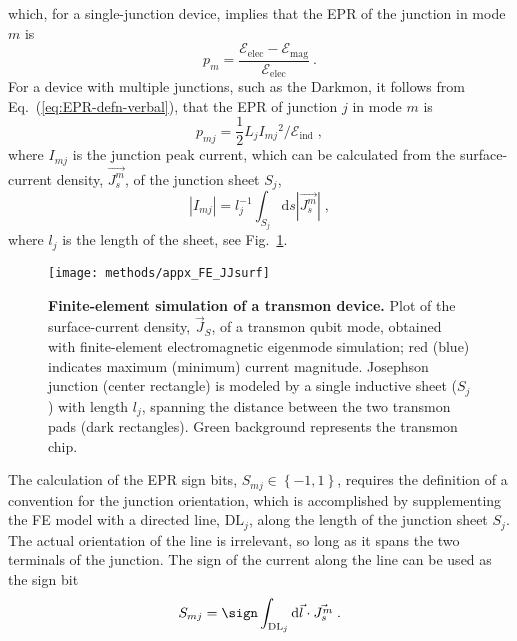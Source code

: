 which, for a single-junction device, implies that the EPR of the junction
in mode $m$ is 
\begin{equation}
p_{m}=\frac{\mathcal{E}_{\mathrm{elec}}-\mathcal{E}_{\mathrm{mag}}}{\mathcal{E}_{\mathrm{elec}}}\:.
\end{equation}
For a device with multiple junctions, such as the Darkmon, it follows
from Eq.~(\ref{eq:EPR-defn-verbal}), that the EPR of junction $j$
in mode $m$ is 
\begin{equation}
p_{mj}=\frac{1}{2}L_{j}I_{mj}{}^{2}/\mathcal{E}_{\mathrm{ind}}\;,\label{eq:appx:FE:pmj}
\end{equation}
where $I_{mj}$ is the junction peak current, which can be calculated
from the surface-current density, $\vec{J_{s}^{m}}$, of the junction
sheet $S_{j}$, 
\begin{equation}
\left|I_{mj}\right|=l_{j}^{-1}\int_{S_{j}}\mathrm{d}s\left|\vec{J_{s}^{m}}\right|\;,\label{eq:appx:FE:ImjAbs}
\end{equation}
where $l_{j}$ is the length of the sheet, see Fig.~\ref{fig:appx:FE JJsurf}.

\begin{figure}[ht]
\centering{}\texttt{[image: methods/appx\_FE\_JJsurf]}
\caption[Finite-element simulation of a transmon device]{\label{fig:appx:FE JJsurf}\textbf{Finite-element simulation of a
transmon device.} Plot of the surface-current density, $\vec{J}_{S}$,
of a transmon qubit mode, obtained with finite-element electromagnetic
eigenmode simulation; red (blue) indicates maximum (minimum) current
magnitude. Josephson junction (center rectangle) is modeled by a single
inductive sheet ($S_{j}$) with length $l_{j}$, spanning the distance
between the two transmon pads (dark rectangles). Green background
represents the transmon chip. }
\end{figure}

The calculation of the EPR sign bits, $S_{mj}\in\left\{ -1,1\right\} $,
requires the definition of a convention for the junction orientation,
which is accomplished by supplementing the FE model with a directed
line, $\mathrm{DL}_{j}$, along the length of the junction sheet $S_{j}$.
The actual orientation of the line is irrelevant, so long as it spans
the two terminals of the junction. The sign of the current along the
line can be used as the sign bit 
\begin{equation}
S_{mj}=\sign\int_{\mathrm{DL}_{j}}\mathrm{d}\vec{l}\cdot\vec{J_{s}^{m}}\;.\label{eq:app:Smj calc}
\end{equation}


